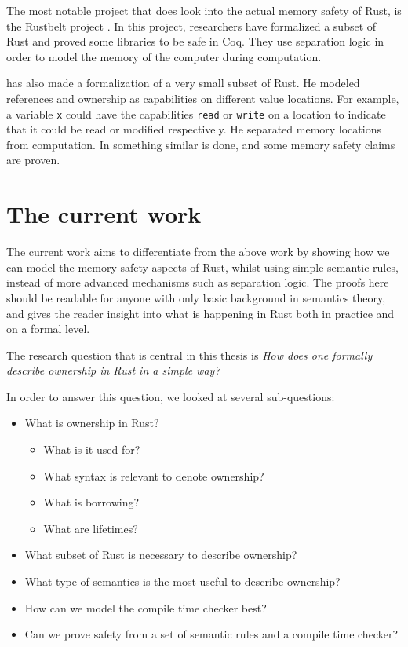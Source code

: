 The most notable project that does look into the actual memory safety of Rust, is the Rustbelt project \citep{jung2017rustbelt}. In this project, researchers have formalized a subset of Rust and proved some libraries to be safe in Coq. They use separation logic in order to model the memory of the computer during computation. 

\cite{benitez2016rusty} has also made a formalization of a very small subset of Rust. He modeled references and ownership as capabilities on different value locations. For example, a variable \verb|x| could have the capabilities \texttt{read} or \texttt{write} on a location to indicate that it could be read or modified respectively. He separated memory locations from computation. In \cite{reed2015patina} something similar is done, and some memory safety claims are proven. 

\section{The current work}
The current work aims to differentiate from the above work by showing how we can model the memory safety aspects of Rust, whilst using simple semantic rules, instead of more advanced mechanisms such as separation logic. The proofs here should be readable for anyone with only basic background in semantics theory, and gives the reader insight into what is happening in Rust both in practice and on a formal level. 

The research question that is central in this thesis is \emph{How does one formally describe ownership in Rust in a simple way?}

In order to answer this question, we looked at several sub-questions:

\begin{itemize}[noitemsep]
    \item What is ownership in Rust?
    \begin{itemize}[noitemsep]
        \item What is it used for?
        \item What syntax is relevant to denote ownership?
        \item What is borrowing?
        \item What are lifetimes?
    \end{itemize}
    \item What subset of Rust is necessary to describe ownership?
    \item What type of semantics is the most useful to describe ownership?
    \item How can we model the compile time checker best?
    \item Can we prove safety from a set of semantic rules and a compile time checker?
\end{itemize}


